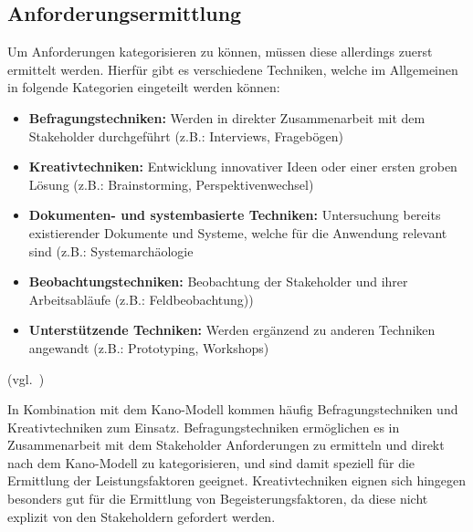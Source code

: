 \subsection{Anforderungsermittlung}\label{subsec:anforderungsermittlung}
Um Anforderungen kategorisieren zu können, müssen diese allerdings zuerst ermittelt werden.
Hierfür gibt es verschiedene Techniken, welche im Allgemeinen in folgende Kategorien eingeteilt werden können:

\begin{itemize}
    \item \textbf{Befragungstechniken:} Werden in direkter Zusammenarbeit mit dem Stakeholder durchgeführt (z.B.: Interviews, Fragebögen)
    \item \textbf{Kreativtechniken:} Entwicklung innovativer Ideen oder einer ersten groben Lösung (z.B.: Brainstorming, Perspektivenwechsel)
    \item \textbf{Dokumenten- und systembasierte Techniken:} Untersuchung bereits existierender Dokumente und Systeme,
    welche für die Anwendung relevant sind (z.B.: Systemarchäologie
    \item \textbf{Beobachtungstechniken:} Beobachtung der Stakeholder und ihrer Arbeitsabläufe (z.B.: Feldbeobachtung))
    \item \textbf{Unterstützende Techniken:} Werden ergänzend zu anderen Techniken angewandt (z.B.: Prototyping, Workshops)
\end{itemize} (vgl.~\autocite{Maulhardt.b})

In Kombination mit dem Kano-Modell kommen häufig Befragungstechniken und Kreativtechniken zum Einsatz.
Befragungstechniken ermöglichen es in Zusammenarbeit mit dem Stakeholder Anforderungen zu ermitteln und direkt nach dem
Kano-Modell zu kategorisieren,
und sind damit speziell für die Ermittlung der Leistungsfaktoren geeignet.
Kreativtechniken eignen sich hingegen besonders gut für die Ermittlung von Begeisterungsfaktoren, da diese nicht explizit
von den Stakeholdern gefordert werden.